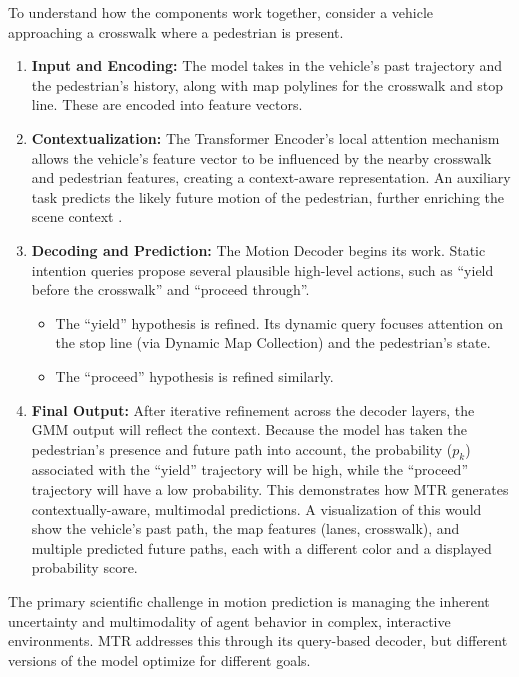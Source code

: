 To understand how the components work together, consider a vehicle approaching a crosswalk where a pedestrian is present.
\begin{enumerate}
    \item \textbf{Input and Encoding:} The model takes in the vehicle's past trajectory and the pedestrian's history, along with map polylines for the crosswalk and stop line. These are encoded into feature vectors.
    \item \textbf{Contextualization:} The Transformer Encoder's local attention mechanism allows the vehicle's feature vector to be influenced by the nearby crosswalk and pedestrian features, creating a context-aware representation. An auxiliary task predicts the likely future motion of the pedestrian, further enriching the scene context \cite{Shi2022MTR}.
    \item \textbf{Decoding and Prediction:} The Motion Decoder begins its work. Static intention queries propose several plausible high-level actions, such as ``yield before the crosswalk'' and ``proceed through''.
    \begin{itemize}
        \item The ``yield'' hypothesis is refined. Its dynamic query focuses attention on the stop line (via Dynamic Map Collection) and the pedestrian's state.
        \item The ``proceed'' hypothesis is refined similarly.
    \end{itemize}
    \item \textbf{Final Output:} After iterative refinement across the decoder layers, the GMM output will reflect the context. Because the model has taken the pedestrian's presence and future path into account, the probability ($p_k$) associated with the ``yield'' trajectory will be high, while the ``proceed'' trajectory will have a low probability. This demonstrates how MTR generates contextually-aware, multimodal predictions. A visualization of this would show the vehicle's past path, the map features (lanes, crosswalk), and multiple predicted future paths, each with a different color and a displayed probability score.
\end{enumerate}


The primary scientific challenge in motion prediction is managing the inherent uncertainty and multimodality of agent behavior in complex, interactive environments. MTR addresses this through its query-based decoder, but different versions of the model optimize for different goals.

